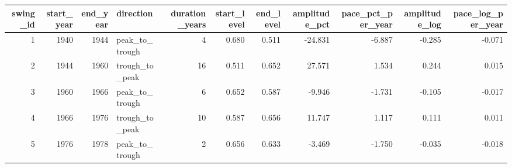 
\begin{tabular}{rrrlrrrrrrr}
\toprule
swing_id & start_year & end_year & direction & duration_years & start_level & end_level & amplitude_pct & pace_pct_per_year & amplitude_log & pace_log_per_year\\
\midrule
1 & 1940 & 1944 & peak_to_trough & 4 & 0.680 & 0.511 & -24.831 & -6.887 & -0.285 & -0.071\\
2 & 1944 & 1960 & trough_to_peak & 16 & 0.511 & 0.652 & 27.571 & 1.534 & 0.244 & 0.015\\
3 & 1960 & 1966 & peak_to_trough & 6 & 0.652 & 0.587 & -9.946 & -1.731 & -0.105 & -0.017\\
4 & 1966 & 1976 & trough_to_peak & 10 & 0.587 & 0.656 & 11.747 & 1.117 & 0.111 & 0.011\\
5 & 1976 & 1978 & peak_to_trough & 2 & 0.656 & 0.633 & -3.469 & -1.750 & -0.035 & -0.018\\
\bottomrule
\end{tabular}
